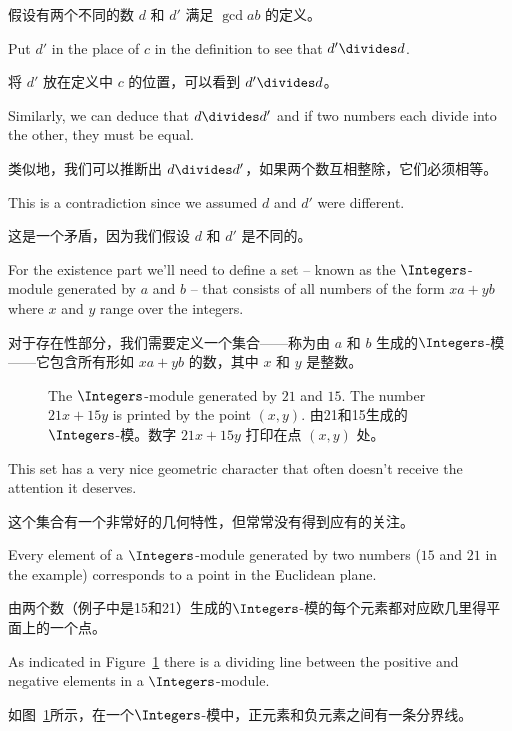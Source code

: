 假设有两个不同的数 $d$ 和 $d'$ 满足 $\gcd{a}{b}$ 的定义。

Put $d'$ in the place of $c$ in the definition to see that $d' \divides d$.

将 $d'$ 放在定义中 $c$ 的位置，可以看到 $d' \divides d$。

Similarly, we can deduce that $d \divides d'$ and if two numbers each divide 
into the other, they must be equal.

类似地，我们可以推断出 $d \divides d'$，如果两个数互相整除，它们必须相等。

This is a contradiction since we
assumed $d$ and $d'$ were different.

这是一个矛盾，因为我们假设 $d$ 和 $d'$ 是不同的。

For the existence part we'll need to define a set -- known as the 
$\Integers$-module generated by $a$ and $b$ -- that consists of all 
numbers of the form $xa+yb$ where $x$ and $y$ range over the integers.

对于存在性部分，我们需要定义一个集合——称为由 $a$ 和 $b$ 生成的$\Integers$-模——它包含所有形如 $xa+yb$ 的数，其中 $x$ 和 $y$ 是整数。

\begin{figure}[!hbtp] 
\begin{center}

\end{center}
\caption[A $\Integers$-module.]{The $\Integers$-module generated by $21$ and %
$15$.  The number $21x+15y$ is printed by the point $(x,y)$. 由21和15生成的$\Integers$-模。数字 $21x+15y$ 打印在点 $(x,y)$ 处。}
\label{fig:zmodule}
\end{figure}

This set has a very nice geometric character that often doesn't receive the
attention it deserves.

这个集合有一个非常好的几何特性，但常常没有得到应有的关注。

Every element of a $\Integers$-module generated
by two numbers ($15$ and $21$ in the example)
corresponds to a point in the Euclidean plane.

由两个数（例子中是15和21）生成的$\Integers$-模的每个元素都对应欧几里得平面上的一个点。

As indicated in 
Figure~\ref{fig:zmodule} there is a dividing line between the positive
and negative elements in a $\Integers$-module.

如图~\ref{fig:zmodule}所示，在一个$\Integers$-模中，正元素和负元素之间有一条分界线。

